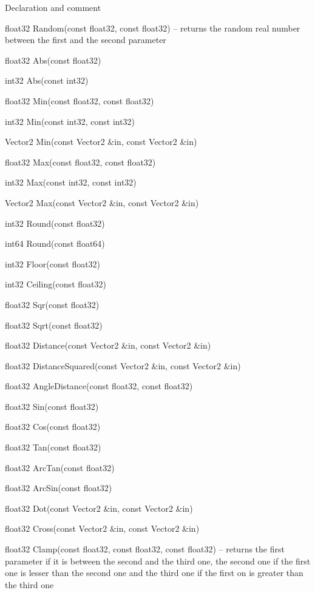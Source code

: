 \begin{titled-itemize}{Declaration and comment}
  \item float32 Random(const float32, const float32) -- returns the random real number between the first and the second parameter
  \item float32 Abs(const float32)
  \item int32 Abs(const int32)
  \item float32 Min(const float32, const float32)
  \item int32 Min(const int32, const int32)
  \item Vector2 Min(const Vector2 \&in, const Vector2 \&in)
  \item float32 Max(const float32, const float32)
  \item int32 Max(const int32, const int32)
  \item Vector2 Max(const Vector2 \&in, const Vector2 \&in)
  \item int32 Round(const float32)
  \item int64 Round(const float64)
  \item int32 Floor(const float32)
  \item int32 Ceiling(const float32)
  \item float32 Sqr(const float32)
  \item float32 Sqrt(const float32)
  \item float32 Distance(const Vector2 \&in, const Vector2 \&in)
  \item float32 DistanceSquared(const Vector2 \&in, const Vector2 \&in)
  \item float32 AngleDistance(const float32, const float32)
  \item float32 Sin(const float32)
  \item float32 Cos(const float32)
  \item float32 Tan(const float32)
  \item float32 ArcTan(const float32)
  \item float32 ArcSin(const float32)
  \item float32 Dot(const Vector2 \&in, const Vector2 \&in)
  \item float32 Cross(const Vector2 \&in, const Vector2 \&in)
  \item float32 Clamp(const float32, const float32, const float32) -- returns the first parameter if it is between the second and the third one, the second one if the first one is lesser than the second one and the third one if the first on is greater than the third one

\end{titled-itemize}
